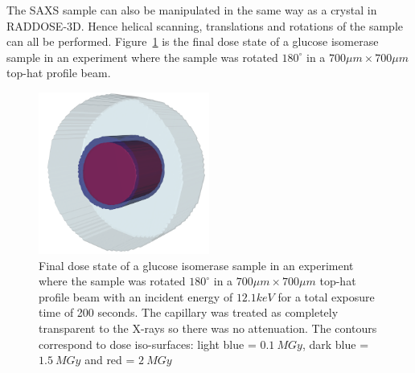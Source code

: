 The SAXS sample can also be manipulated in the same way as a crystal in RADDOSE-3D.
Hence helical scanning, translations and rotations of the sample can all be performed. 
Figure~\ref{fig:SAXS cylinder rotated} is the final dose state of a glucose isomerase sample in an experiment where the sample was rotated $180^{\circ}$ in a $ 700 \mu m \times 700 \mu m $ top-hat profile beam.
\begin{figure}
    \centering
    \includegraphics[width=0.5\textwidth]{figures/saxs/SAXScylinder.png}
    \caption{Final dose state of a glucose isomerase sample in an experiment where the sample was rotated $180^{\circ}$ in a $ 700 \mu m \times 700 \mu m $ top-hat profile beam with an incident energy of $ 12.1 keV $ for a total exposure time of 200 seconds. The capillary was treated as completely transparent to the X-rays so there was no attenuation. The contours correspond to dose iso-surfaces: light blue = $ 0.1\ MGy $, dark blue = $ 1.5\ MGy $ and red = $ 2\ MGy $ }
    \label{fig:SAXS cylinder rotated}
\end{figure}
